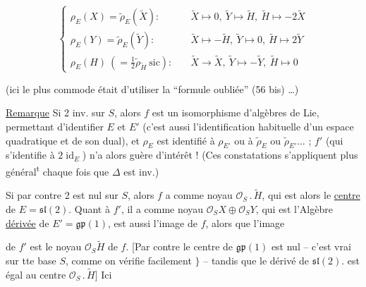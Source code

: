 
\[
\left\{\begin{aligned}
\rho_E(X)=\widetilde\rho_E(\widetilde X):\quad&
\widetilde X\mapsto0,\ \widetilde Y\longmapsto\widetilde H,\ \widetilde H\longmapsto-2\widetilde X\\
\rho_E(Y)=\widetilde\rho_E(\widetilde Y):\quad&
\widetilde X\mapsto-\widetilde H,\ \widetilde Y\mapsto0,\ \widetilde H\mapsto2\widetilde Y\\
\rho_E(H)\ (=\tfrac12\widetilde\rho_{\widetilde H}\ \text{sic}):\quad&
\widetilde X\to\widetilde X,\ \widetilde Y\mapsto-\widetilde Y,\ \widetilde H\mapsto0
\end{aligned}\right. \tag*{(72)}
\]

(ici le plus commode était d'utiliser la ``formule oubliée'' (56 bis) \ldots)

\uline{Remarque} Si 2 inv. sur $S$, alors $f$ est un isomorphisme d'algèbres de Lie,  permettant d'identifier $E$ et $E'$ (c'est aussi l'identification habituelle d'un espace quadratique et de son dual), et $\rho_E$ est identifié à $\rho_{E'}$ ou à $\widetilde\rho_E$ ou $\widetilde\rho_{E'}\ldots$ ; $f'$ (qui s'identifie à $2\operatorname{id}_E$) n'a alors guère d'intérêt ! (Ces constatations s'appliquent plus général\textsuperscript{t} chaque fois que $\Delta$ est inv.)

Si par contre 2 est nul sur $S$, alors $f$ a comme noyau $\mathscr O_S\mathbin{.}\widetilde H$, qui est alors le \uline{centre} de $E=\mathfrak{sl}(2)$. Quant à $f'$, il a comme noyau $\mathscr O_S X\oplus\mathscr O_S Y$, qui est   l'Algèbre \uline{dérivée} de $E'=\mathfrak{gp}(1)$,   est aussi l'image de $f$, alors que l'image


de $f'$ est le noyau $\mathscr O_S\widetilde H$ de $f$. [Par contre le centre de $\mathfrak{gp}(1)$ est nul -- c'est vrai sur tte base $S$, comme on vérifie facilement $\}$ -- tandis que le  dérivé de $\mathfrak{sl}(2).$ est égal au centre $\mathscr O_S\mathbin{.}\widetilde H$] Ici

